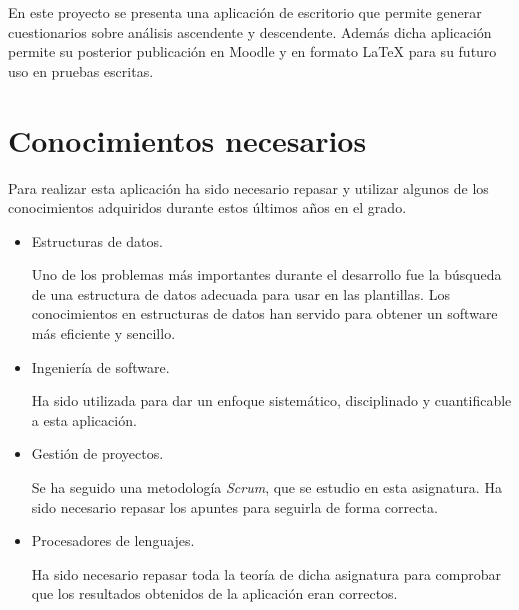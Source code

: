 En este proyecto se presenta una aplicación de escritorio que permite generar cuestionarios sobre análisis ascendente y descendente. Además dicha aplicación permite su posterior publicación en Moodle y en formato \LaTeX{} para su futuro uso en pruebas escritas.


\section{Conocimientos necesarios}
Para realizar esta aplicación ha sido necesario repasar y utilizar algunos de los conocimientos adquiridos durante estos últimos años en el grado.


\begin{itemize}
\item Estructuras de datos.

Uno de los problemas más importantes durante el desarrollo fue la búsqueda de una estructura de datos adecuada para usar en las plantillas. Los conocimientos en estructuras de datos han servido para obtener un software más eficiente y sencillo.
\item Ingeniería de software.

Ha sido utilizada para dar un enfoque sistemático, disciplinado y cuantificable a esta aplicación.

\item Gestión de proyectos.

Se ha seguido una metodología \textit{Scrum}, que se estudio en esta asignatura. Ha sido necesario repasar los apuntes para seguirla de forma correcta.

\item Procesadores de lenguajes.

Ha sido necesario repasar toda la teoría de dicha asignatura para comprobar que los resultados obtenidos de la aplicación eran correctos.

\end{itemize}  
